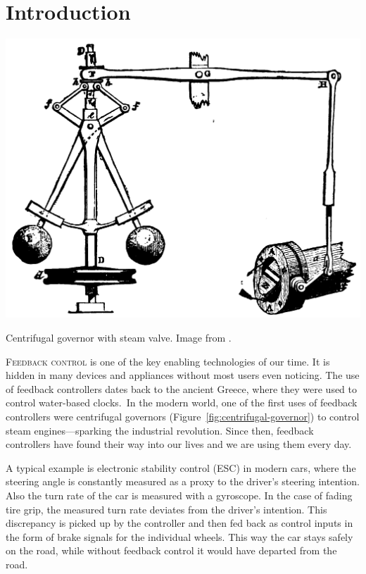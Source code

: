 \chapter{Introduction}
\label{ch:introduction}

\begin{marginfigure}[0.8cm]
\includegraphics[width=\columnwidth]{img/Centrifugal_governor.png}%
\caption[Centrifugal governor with steam valve.]{Centrifugal governor with steam
valve. Image from .}
\label{fig:centrifugal-governor}
\end{marginfigure}


\lettrine{F}{eedback control} is one of the key enabling technologies of our
time. It is hidden in many devices and appliances without most users even
noticing. The use of feedback controllers dates back to the ancient Greece,
where they were used to control water-based clocks.\ \cite[\ts
II.1]{Mayr:1970:Origins}\iss In the modern world, one of the first uses of
feedback controllers were centrifugal governors \cite{Maxwell:1867:Governors}
(Figure~\ref{fig:centrifugal-governor}) to control steam engines---sparking
the industrial revolution. Since then, feedback controllers have found their
way into our lives and we are using them every day.

A typical example is electronic stability control (ESC) in modern cars,
where the steering angle is constantly measured as a proxy to the driver's
steering intention. Also the turn rate of the car is measured with a gyroscope.
In the case of fading tire grip, the measured turn rate deviates from the
driver's intention. This discrepancy is picked up by the controller and then fed
back as control inputs in the form of brake signals for the individual wheels.
This way the car stays safely on the road, while without feedback control it
would have departed from the road.

